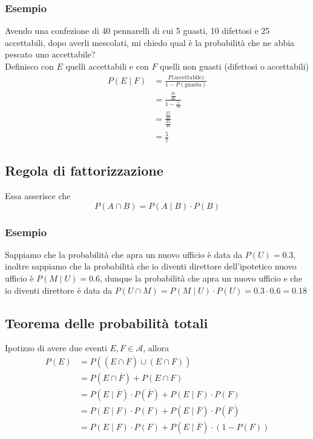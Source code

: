 \documentclass[11pt]{report}
\begin{document}
\subsubsection{Esempio}
Avendo una confezione di 40 pennarelli di cui 5 guasti, 10 difettosi e 25 accettabili, dopo averli mescolati, mi chiedo qual è la probabilità che ne abbia pescato uno accettabile?\\
Definisco con $E$ quelli accettabili e con $F$ quelli non guasti (difettosi o accettabili)
\begin{equation}
    \begin{split}
        P(E \mid F) & = \frac{P(\text{accettabile)}}{1 - P(\text{guasto})}\\
        & = \frac{\frac{25}{40}}{1-\frac{5}{40}}\\
        & = \frac{\frac{25}{40}}{\frac{35}{40}}\\
        & = \frac{5}{7}
    \end{split}
\end{equation}
\subsection{Regola di fattorizzazione}
Essa asserisce che
\begin{equation}
    P(A \cap B) = P(A \mid B) \cdot P(B)
\end{equation}
\subsubsection{Esempio}
Sappiamo che la probabilità che apra un nuovo ufficio è data da $P(U) = 0.3$, inoltre sappiamo che la probabilità che io diventi direttore dell'ipotetico nuovo ufficio è $P(M \mid U) = 0.6$, dunque la probabilità che apra un nuovo ufficio e che io diventi direttore è data da $P(U \cap M) = P(M \mid U) \cdot P(U) = 0.3 \cdot 0.6 = 0.18$
\subsection{Teorema delle probabilità totali}
Ipotizzo di avere due eventi $E,F \in \mathcal{A}$, allora
\begin{equation}
    \begin{split}
        P(E) & = P((E \cap \overline{F}) \cup (E \cap F))\\
        & = P(E \cap \overline{F}) + P(E \cap F)\\
        & = P(E \mid \overline{F}) \cdot P(\overline{F}) + P(E \mid F) \cdot P(F)\\
        & = P(E \mid F) \cdot P(F) + P(E \mid \overline{F}) \cdot P(\overline{F})\\
        & = P(E \mid F) \cdot P(F) + P(E \mid \overline{F}) \cdot (1 - P(F))
    \end{split}
\end{equation}
\end{document}
